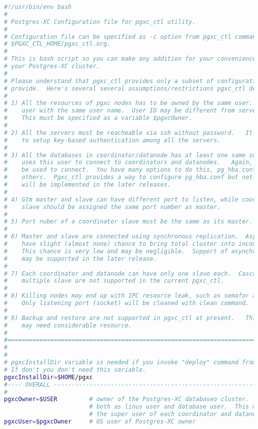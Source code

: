\label{appendix:pgxcctlconfig} 
\begin{lstlisting}[language=bash,caption={Konfigurationsdatei pgxc-ctl}]
#!/usr/bin/env bash
#
# Postgres-XC Configuration file for pgxc_ctl utility. 
#
# Configuration file can be specified as -c option from pgxc_ctl command.   Default is
# $PGXC_CTL_HOME/pgxc_ctl.org.
#
# This is bash script so you can make any addition for your convenience to configure
# your Postgres-XC cluster.
#
# Please understand that pgxc_ctl provides only a subset of configuration which pgxc_ctl
# provide.  Here's several several assumptions/restrictions pgxc_ctl depends on.
#
# 1) All the resources of pgxc nodes has to be owned by the same user.   Same user means
#    user with the same user name.  User ID may be different from server to server.
#    This must be specified as a variable $pgxcOwner.
#
# 2) All the servers must be reacheable via ssh without password.   It is highly recommended
#    to setup key-based authentication among all the servers.
#
# 3) All the databases in coordinator/datanode has at least one same superuser.  Pgxc_ctl
#    uses this user to connect to coordinators and datanodes.   Again, no password should
#    be used to connect.  You have many options to do this, pg_hba.conf, pg_ident.conf and
#    others.  Pgxc_ctl provides a way to configure pg_hba.conf but not pg_ident.conf.   This
#    will be implemented in the later releases.
#
# 4) Gtm master and slave can have different port to listen, while coordinator and datanode
#    slave should be assigned the same port number as master.
#
# 5) Port nuber of a coordinator slave must be the same as its master.
#
# 6) Master and slave are connected using synchronous replication.  Asynchronous replication
#    have slight (almost none) chance to bring total cluster into inconsistent state.
#    This chance is very low and may be negligible.  Support of asynchronous replication
#    may be supported in the later release.
#
# 7) Each coordinator and datanode can have only one slave each.  Cascaded replication and
#    multiple slave are not supported in the current pgxc_ctl.
#
# 8) Killing nodes may end up with IPC resource leak, such as semafor and shared memory.
#    Only listening port (socket) will be cleaned with clean command.
#
# 9) Backup and restore are not supported in pgxc_ctl at present.   This is a big task and
#    may need considerable resource.
#
#========================================================================================
#
#
# pgxcInstallDir variable is needed if you invoke "deploy" command from pgxc_ctl utility.
# If don't you don't need this variable.
pgxcInstallDir=$HOME/pgxc
#---- OVERALL -----------------------------------------------------------------------------
#
pgxcOwner=$USER			# owner of the Postgres-XC databaseo cluster.  Here, we use this
						# both as linus user and database user.  This must be
						# the super user of each coordinator and datanode.
pgxcUser=$pgxcOwner		# OS user of Postgres-XC owner


\end{lstlisting}
